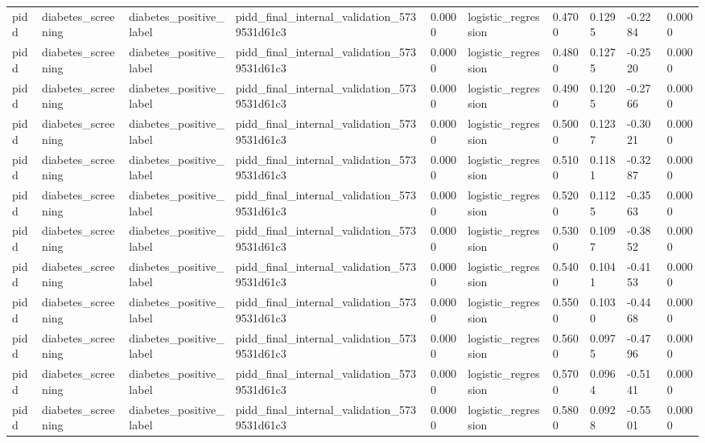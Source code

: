 \begin{tabular}{llllllllll}
pidd & diabetes\_screening & diabetes\_positive\_label & pidd\_final\_internal\_validation\_5739531d61c3 & 0.0000 & logistic\_regression & 0.4700 & 0.1295 & -0.2284 & 0.0000 \\
pidd & diabetes\_screening & diabetes\_positive\_label & pidd\_final\_internal\_validation\_5739531d61c3 & 0.0000 & logistic\_regression & 0.4800 & 0.1275 & -0.2520 & 0.0000 \\
pidd & diabetes\_screening & diabetes\_positive\_label & pidd\_final\_internal\_validation\_5739531d61c3 & 0.0000 & logistic\_regression & 0.4900 & 0.1205 & -0.2766 & 0.0000 \\
pidd & diabetes\_screening & diabetes\_positive\_label & pidd\_final\_internal\_validation\_5739531d61c3 & 0.0000 & logistic\_regression & 0.5000 & 0.1237 & -0.3021 & 0.0000 \\
pidd & diabetes\_screening & diabetes\_positive\_label & pidd\_final\_internal\_validation\_5739531d61c3 & 0.0000 & logistic\_regression & 0.5100 & 0.1181 & -0.3287 & 0.0000 \\
pidd & diabetes\_screening & diabetes\_positive\_label & pidd\_final\_internal\_validation\_5739531d61c3 & 0.0000 & logistic\_regression & 0.5200 & 0.1125 & -0.3563 & 0.0000 \\
pidd & diabetes\_screening & diabetes\_positive\_label & pidd\_final\_internal\_validation\_5739531d61c3 & 0.0000 & logistic\_regression & 0.5300 & 0.1097 & -0.3852 & 0.0000 \\
pidd & diabetes\_screening & diabetes\_positive\_label & pidd\_final\_internal\_validation\_5739531d61c3 & 0.0000 & logistic\_regression & 0.5400 & 0.1041 & -0.4153 & 0.0000 \\
pidd & diabetes\_screening & diabetes\_positive\_label & pidd\_final\_internal\_validation\_5739531d61c3 & 0.0000 & logistic\_regression & 0.5500 & 0.1030 & -0.4468 & 0.0000 \\
pidd & diabetes\_screening & diabetes\_positive\_label & pidd\_final\_internal\_validation\_5739531d61c3 & 0.0000 & logistic\_regression & 0.5600 & 0.0975 & -0.4796 & 0.0000 \\
pidd & diabetes\_screening & diabetes\_positive\_label & pidd\_final\_internal\_validation\_5739531d61c3 & 0.0000 & logistic\_regression & 0.5700 & 0.0964 & -0.5141 & 0.0000 \\
pidd & diabetes\_screening & diabetes\_positive\_label & pidd\_final\_internal\_validation\_5739531d61c3 & 0.0000 & logistic\_regression & 0.5800 & 0.0928 & -0.5501 & 0.0000 \\

\end{tabular}
